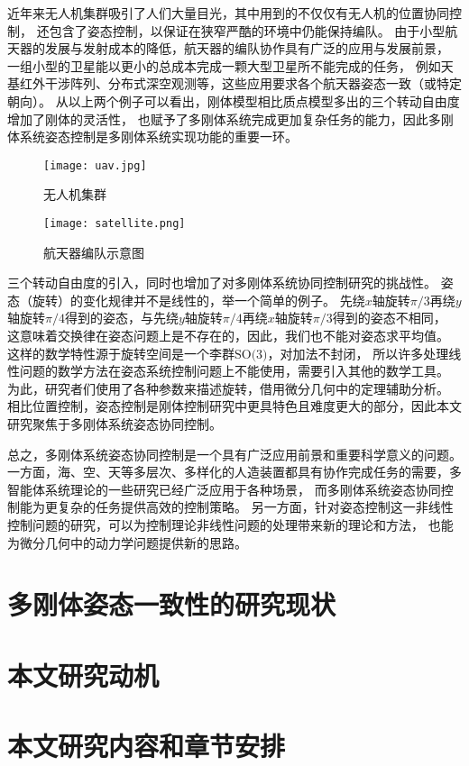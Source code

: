 近年来无人机集群吸引了人们大量目光，其中用到的不仅仅有无人机的位置协同控制，
还包含了姿态控制，以保证在狭窄严酷的环境中仍能保持编队。
由于小型航天器的发展与发射成本的降低，航天器的编队协作具有广泛的应用与发展前景\cite{long2021distributed}\cite{jin2023synchronization}，
一组小型的卫星能以更小的总成本完成一颗大型卫星所不能完成的任务，
例如天基红外干涉阵列、分布式深空观测等，这些应用要求各个航天器姿态一致（或特定朝向）。
从以上两个例子可以看出，刚体模型相比质点模型多出的三个转动自由度增加了刚体的灵活性，
也赋予了多刚体系统完成更加复杂任务的能力，因此多刚体系统姿态控制是多刚体系统实现功能的重要一环。
\begin{figure}[!htp]
    \centering
    \begin{minipage}{0.48\textwidth}
      \centering
      \texttt{[image: uav.jpg]}
      \caption{无人机集群}
      \label{fig:uav}
    \end{minipage}\hfill
    \begin{minipage}{0.48\textwidth}
      \centering
      \texttt{[image: satellite.png]}
      \caption{航天器编队示意图}
      \label{fig:satellite}
    \end{minipage}
  \end{figure}

三个转动自由度的引入，同时也增加了对多刚体系统协同控制研究的挑战性。
姿态（旋转）的变化规律并不是线性的，举一个简单的例子。
先绕$x$轴旋转$\pi/3$再绕$y$轴旋转$\pi/4$得到的姿态，与先绕$y$轴旋转$\pi/4$再绕$x$轴旋转$\pi/3$得到的姿态不相同，
这意味着交换律在姿态问题上是不存在的，因此，我们也不能对姿态求平均值。
这样的数学特性源于旋转空间是一个李群$\text{SO(3)}$\cite{sola2018micro}，对加法不封闭，
所以许多处理线性问题的数学方法在姿态系统控制问题上不能使用，需要引入其他的数学工具。
为此，研究者们使用了各种参数来描述旋转，借用微分几何中的定理辅助分析。
相比位置控制，姿态控制是刚体控制研究中更具特色且难度更大的部分，因此本文研究聚焦于多刚体系统姿态协同控制。

总之，多刚体系统姿态协同控制是一个具有广泛应用前景和重要科学意义的问题。
一方面，海、空、天等多层次、多样化的人造装置都具有协作完成任务的需要，多智能体系统理论的一些研究已经广泛应用于各种场景，
而多刚体系统姿态协同控制能为更复杂的任务提供高效的控制策略。
另一方面，针对姿态控制这一非线性控制问题的研究，可以为控制理论非线性问题的处理带来新的理论和方法，
也能为微分几何中的动力学问题提供新的思路。

\section{多刚体姿态一致性的研究现状}

\section{本文研究动机}
\section{本文研究内容和章节安排}
